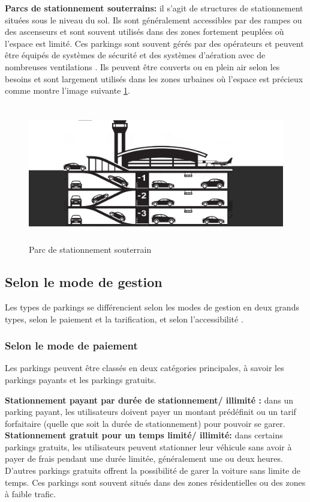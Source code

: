 \begin{outline}
\1 \textbf{Parcs de stationnement souterrains: } il s'agit de structures de stationnement situées sous le niveau du sol. Ils sont généralement accessibles par des rampes ou des ascenseurs et sont souvent utilisés dans des zones fortement peuplées où l'espace est limité. Ces parkings sont souvent gérés par des opérateurs et peuvent être équipés de systèmes de sécurité et des systèmes d'aération avec de nombreuses ventilations \cite{yespark-lexique}. Ils peuvent être couverts ou en plein air selon les besoins et sont largement utilisés dans les zones urbaines où l'espace est précieux comme montre l'image suivante \ref{Undergroundpark}.

\begin{figure}[H]
	\centering
	\includegraphics[height=06cm]{img/ch1-Underground parking garages-01.jpeg}
	\caption{Parc de stationnement souterrain}
 \label{Undergroundpark}
\end{figure}


\end{outline}

\subsection{Selon le mode de gestion}
Les types de parkings se différencient selon les modes de gestion en deux grands types, selon le paiement et la tarification, et selon l'accessibilité .

\subsubsection{Selon le mode de paiement}
Les parkings peuvent être classés en deux catégories principales, à savoir les parkings payants et les parkings gratuits.
\begin{outline}
    \1 \textbf{Stationnement payant par durée de stationnement/ illimité :} dans un parking payant, les utilisateurs doivent payer un montant prédéfinit ou un tarif forfaitaire  (quelle que soit la durée de stationnement) pour pouvoir se garer.
    \1 \textbf{Stationnement gratuit pour un temps limité/ illimité:}
    dans certains parkings gratuits, les utilisateurs peuvent stationner leur véhicule sans avoir à payer de frais pendant une durée limitée, généralement une ou deux heures. D'autres parkings gratuits offrent la possibilité de garer la voiture sans limite de temps. Ces parkings sont souvent situés dans des zones résidentielles ou des zones à faible trafic.
\end{outline}

